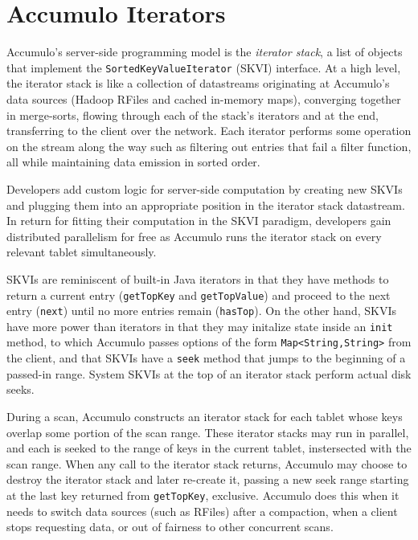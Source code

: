 \section{Accumulo Iterators}
Accumulo's server-side programming model is the %
\emph{iterator stack}, a list of objects that implement the \texttt{SortedKeyValueIterator} (SKVI) interface.
At a high level, the iterator stack is like a collection of datastreams originating
at Accumulo's data sources (Hadoop RFiles and cached in-memory maps), converging together in merge-sorts,
flowing through each of the stack's iterators and at the end, transferring to the client over the network.
Each iterator performs some operation on the stream along the way such as filtering out entries that
fail a filter function, all while maintaining data emission in sorted order.

Developers add custom logic for server-side computation
by creating new SKVIs and plugging them into an appropriate position in the iterator stack datastream.
In return for fitting their computation in the SKVI paradigm, developers gain
distributed parallelism for free as Accumulo runs the iterator stack on every relevant tablet simultaneously.


SKVIs are reminiscent of built-in Java iterators %
in that they have methods to return a current entry (\texttt{getTopKey} and \texttt{getTopValue})
and proceed to the next entry (\texttt{next}) until no more entries remain (\texttt{hasTop}).
On the other hand, SKVIs have more power than iterators in that they may initalize state
inside an \texttt{init} method, to which Accumulo passes
options of the form \texttt{Map<String,String>} from the client,
and that SKVIs have a \texttt{seek} method that jumps to the beginning of a passed-in range. 
System SKVIs at the top of an iterator stack perform actual disk seeks.%

During a scan, Accumulo constructs an iterator stack for each tablet whose keys overlap some portion 
of the scan range. These iterator stacks may run in parallel, and each is seeked to the range of 
keys in the current tablet, instersected with the scan range. When any call to the iterator stack 
returns, Accumulo may choose to destroy the iterator stack and later re-create it,
passing a new seek range starting at the last key returned from \texttt{getTopKey}, exclusive.
Accumulo does this when it needs to switch data sources (such as RFiles) after a compaction, 
when a client stops requesting data, or out of fairness to other concurrent scans.

